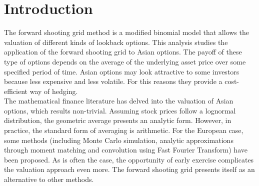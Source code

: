 \documentclass[12pt]{article}
\numberwithin{equation}{section}
\begin{document}
\maketitle
\pagestyle{plain}
\tableofcontents
\newpage
\clearpage
{}

\section{Introduction}
The forward shooting grid method is a modified binomial model that allows the valuation of different kinds of lookback options. This analysis studies the application of the forward shooting grid to Asian options. The payoff of these type of options depends on the average of the underlying asset price over some specified period of time. Asian options may look attractive to some investors because less expensive and less volatile. For this reasons they provide a cost-efficient way of hedging. \\
\newline
The mathematical finance literature has delved into the valuation of Asian options, which results non-trivial. Assuming stock prices follow a lognormal distribution, the geometric average presents an analytic form. However, in practice, the standard form of averaging is arithmetic. For the European case, some methods (including Monte Carlo simulation, analytic approximations through moment matching and convolution using Fast Fourier Transform) have been proposed. As is often the case, the opportunity of early exercise complicates the valuation approach even more. The forward shooting grid presents itself as an alternative to other methods.
\end{document}

